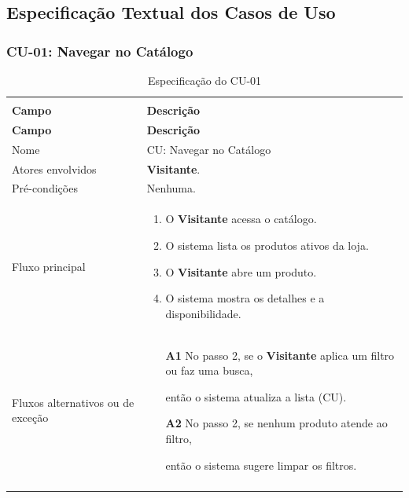 \documentclass[12pt,a4paper]{article}
\begin{document}
\subsection{Especificação Textual dos Casos de Uso}

\Needspace{200pt}
\subsubsection{CU-01: Navegar no Catálogo}

{\setlength{\arrayrulewidth}{0.3pt}\renewcommand{\arraystretch}{1.1}\small{}
\begin{xltabular}{\textwidth}{>{\raggedright\arraybackslash}p{3.4cm}|>{\raggedright\arraybackslash}X}
\caption{Especificação do CU-01}\\
\toprule{}
\textbf{Campo} & \textbf{Descrição}\\ \midrule{}
\endfirsthead
{}\toprule{}
\textbf{Campo} & \textbf{Descrição}\\ \midrule{}
\endhead
\endlastfoot
Nome & CU: Navegar no Catálogo\\ \hline
Atores envolvidos & \textbf{Visitante}.\\ \hline
Pré-condições & Nenhuma.\\ \hline
Fluxo principal & \begin{enumerate}[nosep,leftmargin=1.4em,label=\arabic*.,before=\vspace{-\baselineskip},after=\vspace{-0.4\baselineskip}]\item O \textbf{Visitante} acessa o catálogo. \item O sistema lista os produtos ativos da loja. \item O \textbf{Visitante} abre um produto. \item O sistema mostra os detalhes e a disponibilidade. \end{enumerate}\\ \hline
Fluxos alternativos ou de exceção & \begin{itemize}[nosep,leftmargin=2.2em,labelwidth=2.2em,labelsep=0pt,align=left,itemsep=4pt,before=\vspace{-\baselineskip},after=\vspace{-0.4\baselineskip}]\item[\textbf{A1}] No passo 2, se o \textbf{Visitante} aplica um filtro ou faz uma busca,\par então o sistema atualiza a lista (CU). \item[\textbf{A2}] No passo 2, se nenhum produto atende ao filtro,\par então o sistema sugere limpar os filtros.\end{itemize}\\ \bottomrule
\end{xltabular}}
\end{document}

